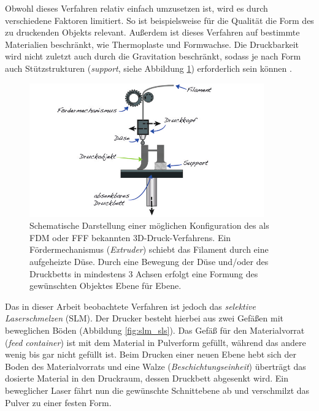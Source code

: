 		Obwohl dieses Verfahren relativ einfach umzusetzen ist, wird es durch verschiedene
		Faktoren limitiert. So ist beispielsweise für die Qualität die Form des zu druckenden
		Objekts relevant. Außerdem ist dieses Verfahren auf bestimmte Materialien beschränkt, wie
		Thermoplaste und Formwachse. Die Druckbarkeit wird nicht zuletzt auch durch die
		Gravitation beschränkt, sodass je nach Form auch Stützstrukturen (\emph{support}, siehe
		Abbildung \ref{fig:fdm}) erforderlich sein können \cite{wikipedia2021fused}.

		\begin{figure}[!ht]
			\centering
			\includegraphics[width=0.9\textwidth]{chapter/main/img/fdm.png}
			\caption[Schematische Darstellung des FDM-/FFF-Verfahrens]{Schematische Darstellung
			einer möglichen Konfiguration des als FDM oder FFF bekannten 3D-Druck-Verfahrens. Ein
			Fördermechanismus (\emph{Extruder}) schiebt das Filament durch eine aufgeheizte Düse.
			Durch eine Bewegung der Düse und/oder des Druckbetts in mindestens 3 Achsen erfolgt
			eine Formung des gewünschten Objektes Ebene für Ebene. \cite[S. 114]{horsch20143d}}
			\label{fig:fdm}
		\end{figure}

		Das in dieser Arbeit beobachtete Verfahren ist jedoch das \emph{selektive Laserschmelzen}
		(SLM). Der Drucker besteht hierbei aus zwei Gefäßen mit beweglichen Böden (Abbildung
		\ref{fig:slm_sls}). Das Gefäß für den Materialvorrat (\emph{feed container}) ist mit dem
		Material in Pulverform gefüllt, während das andere wenig bis gar nicht gefüllt ist. Beim
		Drucken einer neuen Ebene hebt sich der Boden des Materialvorrats und eine Walze
		(\emph{Beschichtungseinheit}) überträgt das dosierte Material in den Druckraum, dessen
		Druckbett abgesenkt wird. Ein beweglicher Laser fährt nun die gewünschte Schnittebene ab
		und verschmilzt das Pulver zu einer festen Form.

